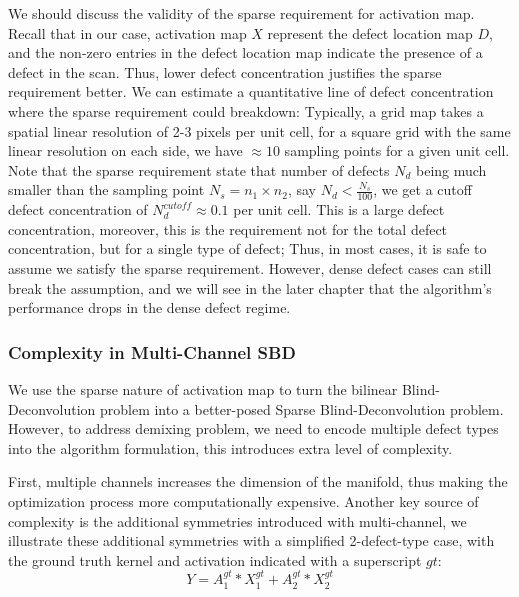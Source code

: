 We should discuss the validity of the sparse requirement for activation map. Recall that in our case, activation map $X$ represent the defect location map $D$, and the non-zero entries in the defect location map indicate the presence of a defect in the scan. Thus, lower defect concentration justifies the sparse requirement better. We can estimate a quantitative line of defect concentration where the sparse requirement could breakdown: Typically, a grid map takes a spatial linear resolution of 2-3 pixels per unit cell, for a square grid with the same linear resolution on each side, we have $\approx 10$ sampling points for a given unit cell. Note that the sparse requirement state that number of defects $N_d$ being much smaller than the sampling point $N_s = n_1 \times n_2$, say $N_d < \frac{N_s}{100}$, we get a cutoff defect concentration of $N_d^{cutoff} \approx 0.1$ per unit cell. This is a large defect concentration, moreover, this is the requirement not for the total defect concentration, but for a single type of defect; Thus, in most cases, it is safe to assume we satisfy the sparse requirement. However, dense defect cases can still break the assumption, and we will see in the later chapter that the algorithm's performance drops in the dense defect regime. 

\subsubsection{Complexity in Multi-Channel SBD}
We use the sparse nature of activation map to turn the bilinear Blind-Deconvolution problem into a better-posed Sparse Blind-Deconvolution problem. However, to address demixing problem, we need to encode multiple defect types into the algorithm formulation, this introduces extra level of complexity. 

First, multiple channels increases the dimension of the manifold, thus making the optimization process more computationally expensive. Another key source of complexity is the additional symmetries introduced with multi-channel, we illustrate these additional symmetries with a simplified 2-defect-type case, with the ground truth kernel and activation indicated with a superscript $gt$: 
\begin{equation*}
	Y = A_1^{gt}*X_1^{gt} + A_2^{gt}*X_2^{gt}
\end{equation*} 

